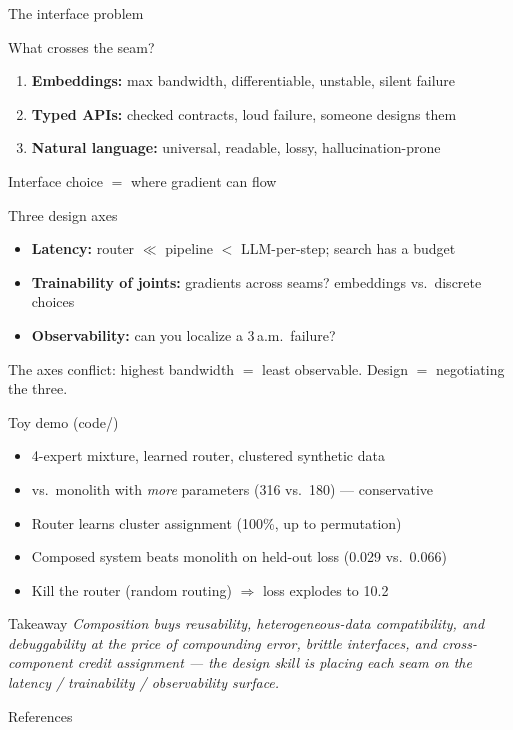 \documentclass[aspectratio=169,11pt]{beamer}
\begin{document}
\begin{frame}{The interface problem}
\begin{block}{What crosses the seam?}
\begin{enumerate}
\item \textbf{Embeddings:} max bandwidth, differentiable, unstable, silent failure
\item \textbf{Typed APIs:} checked contracts, loud failure, someone designs them \cite{schick2023toolformer}
\item \textbf{Natural language:} universal, readable, lossy, hallucination-prone \cite{ahn2022saycan}
\end{enumerate}
\end{block}
Interface choice $=$ where gradient can flow
\end{frame}

\begin{frame}{Three design axes}
\begin{itemize}
\item \textbf{Latency:} router $\ll$ pipeline $<$ LLM-per-step; search has a budget \cite{schrittwieser2020muzero}
\item \textbf{Trainability of joints:} gradients across seams? embeddings vs.\ discrete choices
\item \textbf{Observability:} can you localize a 3\,a.m.\ failure?
\end{itemize}

The axes conflict: highest bandwidth $=$ least observable. Design $=$ negotiating the three.
\end{frame}

\begin{frame}{Toy demo (code/)}
\begin{itemize}
\item 4-expert mixture, learned router, clustered synthetic data
\item vs.\ monolith with \emph{more} parameters (316 vs.\ 180) --- conservative
\item Router learns cluster assignment (100\%, up to permutation)
\item Composed system beats monolith on held-out loss (0.029 vs.\ 0.066)
\item Kill the router (random routing) $\Rightarrow$ loss explodes to 10.2
\end{itemize}
\end{frame}

\begin{frame}{Takeaway}
\emph{Composition buys reusability, heterogeneous-data compatibility, and debuggability at the price of compounding error, brittle interfaces, and cross-component credit assignment --- the design skill is placing each seam on the latency / trainability / observability surface.}
\end{frame}

\begin{frame}[allowframebreaks]{References}
\footnotesize


\end{frame}
\end{document}
